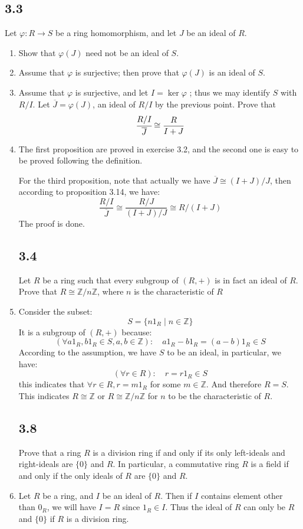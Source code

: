 \documentclass[a4paper, pdf, 12pt]{article}
\makeatletter
\renewenvironment{proof}[1][\proofname]{\par
  \pushQED{\qed}%
  \normalfont \topsep6\p@\@plus6\p@\relax
  \trivlist
  \item[%
    \hskip\labelsep
    \normalfont\bfseries %
    #1%
    \@addpunct{.}%
  ]\ignorespaces
}{%
  \popQED\endtrivlist\@endpefalse
}
\let\qed\relax %
\DeclareRobustCommand{\qed}{%
  \ifmmode \mathqed
  \else
    \leavevmode\unskip\penalty\@M\hbox{}\nobreak\hspace{.5em minus .1em}%
    \hbox{\qedsymbol}%
  \fi
}
\makeatother
\begin{document}
\subsection*{3.3}
Let $\varphi: R \rightarrow S$ be a ring homomorphism, and let $J$ be an ideal of $R$.
\begin{enumerate}
  \item Show that $\varphi(J)$ need not be an ideal of $S$.

  \item Assume that $\varphi$ is surjective; then prove that $\varphi(J)$ is an ideal of $S$.
  
  \item Assume that $\varphi$ is surjective, and let $I = \ker \varphi$ ; thus we may identify 
  $S$ with $R/I$. Let $\overline{J} = \varphi(J)$, an ideal of $R/I$ by the previous point. Prove that
  $$
  \cfrac{R/I}{\overline{J}}\cong \frac{R}{I+J}
  $$
  \begin{proof}
    The first proposition are proved in exercise 3.2, and the second 
    one is easy to be proved following the definition. 

    For the third proposition, note that actually we have $\overline{J}\cong (I+J)/J$, then according 
    to proposition 3.14, we have:
    $$
    \frac{R/I}{\overline{J}}\cong \frac{R/J}{(I+J)/J}\cong R/(I+J)
    $$
    The proof is done.
  \end{proof}
  \subsection*{3.4}
  Let $R$ be a ring such that every subgroup of $(R, +)$ is in fact an ideal of $R$. Prove that 
  $R \cong \mathbb{Z}/n\mathbb{Z}$, where $n$ is the characteristic of $R$
  \begin{proof}
    Consider the subset:
    $$
    S=\{n1_{R}\mid n\in \mathbb{Z}\}
    $$
    It is a subgroup of $(R, +)$ because: 
    $$
    (\forall a1_{R}, b1_{R}\in S, a,b\in \mathbb{Z}):\quad a1_{R}-b1_{R}=(a-b)1_{R}\in S
    $$
    According to the assumption, we have $S$ to be an ideal, in particular, we have:
    $$
    (\forall r\in R): \quad r = r1_{R} \in S
    $$
    this indicates that $\forall r\in R, r=m1_{R}$ for some $m\in \mathbb{Z}$. And therefore 
    $R=S$. This indicates $R\cong \mathbb{Z}$ or $R\cong \mathbb{Z}/n\mathbb{Z}$ for $n$ to be 
    the characteristic of $R$.
  \end{proof}
  \subsection*{3.8}
  Prove that a ring $R$ is a division ring if and only if its only left-ideals and right-ideals 
  are $\{ 0 \}$ and $R$.
  In particular, a commutative ring $R$ is a ﬁeld if and only if the only ideals of $R$ are $\{0\}$ 
  and $R$.
  \begin{proof}
    Let $R$ be a ring, and $I$ be an ideal of $R$. Then if $I$ contains element 
    other than $0_{R}$, we will have $I=R$ since $1_{R}\in I$. Thus the ideal of $R$ can only be 
    $R$ and $\{0\}$ if $R$ is a division ring. 


\end{proof}
\end{enumerate}
\end{document}
